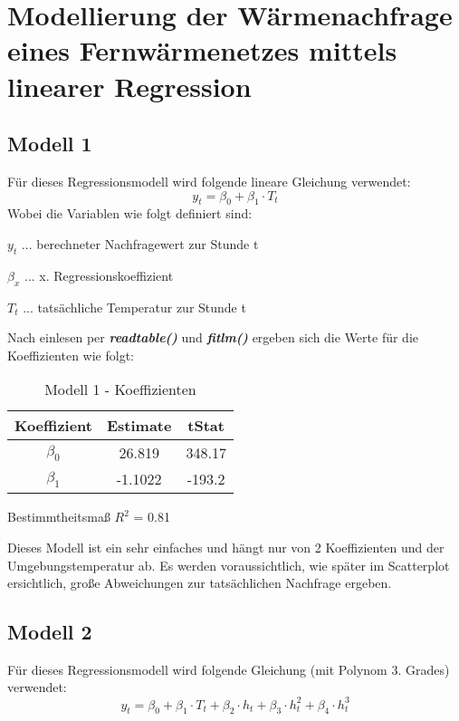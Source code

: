 \documentclass{eegreport}
\begin{document}
\mytitlepage
{} 
\tableofcontents 
{} 
\pagebreak


\section{Modellierung der Wärmenachfrage eines Fernwärmenetzes mittels linearer Regression}
\subsection{Modell 1}\label{Modell1}
Für dieses Regressionsmodell wird folgende lineare Gleichung verwendet:
\begin{equation}\label{Gleichung Modell 1}
y_t = \beta_0 + \beta_1 \cdot T_t
\end{equation}
Wobei die Variablen wie folgt definiert sind:
\begin{center}
\parbox{10cm}{
$y_t$ ... berechneter Nachfragewert zur Stunde t

$\beta_x$ ... x. Regressionskoeffizient

$T_t$ ... tatsächliche Temperatur zur Stunde t}
\end{center}
Nach einlesen per \textbf{\emph{readtable()}} und \textbf{\emph{fitlm()}} ergeben sich die Werte für die Koeffizienten wie folgt:

\begin{table}[h]
\begin{center}
\begin{tabular}{|c|c|c|}
\hline 
 Koeffizient & Estimate & tStat \\ 
\hline 
$\beta_0$ & 26.819 & 348.17 \\ 
\hline 
$\beta_1$ & -1.1022 & -193.2 \\ 
\hline 
\end{tabular} 
\end{center}
\caption{Modell 1 - Koeffizienten}
\label{modell1koeff}
\end{table}

Bestimmtheitsmaß $R^2$ = 0.81

Dieses Modell ist ein sehr einfaches und hängt nur von 2 Koeffizienten und der Umgebungstemperatur ab. Es werden voraussichtlich, wie später im Scatterplot ersichtlich, große Abweichungen zur tatsächlichen Nachfrage ergeben.

\subsection{Modell 2}
Für dieses Regressionsmodell wird folgende Gleichung (mit Polynom 3. Grades) verwendet:
\begin{equation}\label{Gleichung Modell 2}
y_t = \beta_0 + \beta_1 \cdot T_t + \beta_2 \cdot h_t + \beta_3 \cdot h_t^2 + \beta_4 \cdot h_t^3
\end{equation}
\end{document}

